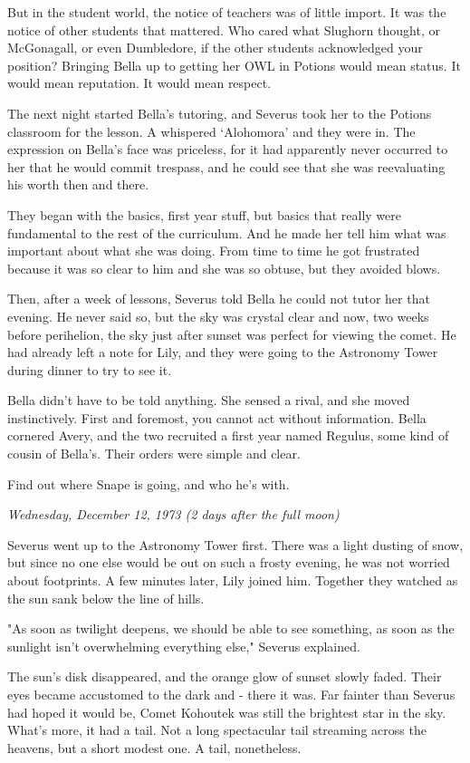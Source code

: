 \documentclass[a4paper,11pt]{article}
\begin{document}
But in the student world, the notice of teachers was of little import. It was the notice of other students that mattered. Who cared what Slughorn thought, or McGonagall, or even Dumbledore, if the other students acknowledged your position? Bringing Bella up to getting her OWL in Potions would mean status. It would mean reputation. It would mean respect.

The next night started Bella's tutoring, and Severus took her to the Potions classroom for the lesson. A whispered `Alohomora' and they were in. The expression on Bella's face was priceless, for it had apparently never occurred to her that he would commit trespass, and he could see that she was reevaluating his worth then and there.

They began with the basics, first year stuff, but basics that really were fundamental to the rest of the curriculum. And he made her tell him what was important about what she was doing. From time to time he got frustrated because it was so clear to him and she was so obtuse, but they avoided blows.

Then, after a week of lessons, Severus told Bella he could not tutor her that evening. He never said so, but the sky was crystal clear and now, two weeks before perihelion, the sky just after sunset was perfect for viewing the comet. He had already left a note for Lily, and they were going to the Astronomy Tower during dinner to try to see it.

Bella didn't have to be told anything. She sensed a rival, and she moved instinctively. First and foremost, you cannot act without information. Bella cornered Avery, and the two recruited a first year named Regulus, some kind of cousin of Bella's. Their orders were simple and clear.

Find out where Snape is going, and who he's with.

\emph{Wednesday, December 12, 1973 (2 days after the full moon)}

Severus went up to the Astronomy Tower first. There was a light dusting of snow, but since no one else would be out on such a frosty evening, he was not worried about footprints. A few minutes later, Lily joined him. Together they watched as the sun sank below the line of hills.

"As soon as twilight deepens, we should be able to see something, as soon as the sunlight isn't overwhelming everything else," Severus explained.

The sun's disk disappeared, and the orange glow of sunset slowly faded. Their eyes became accustomed to the dark and - there it was. Far fainter than Severus had hoped it would be, Comet Kohoutek was still the brightest star in the sky. What's more, it had a tail. Not a long spectacular tail streaming across the heavens, but a short modest one. A tail, nonetheless.
\end{document}
